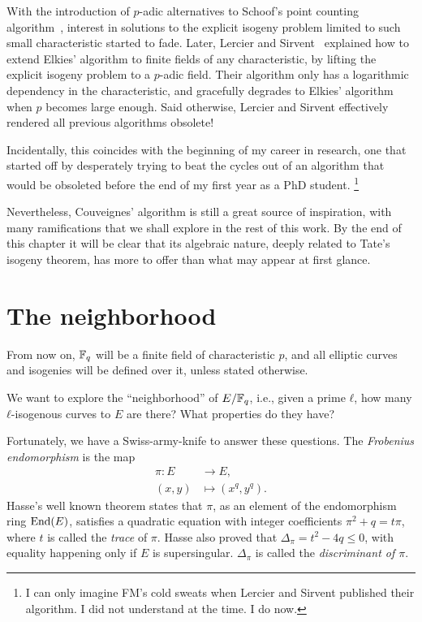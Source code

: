 \documentclass{report}
\theoremstyle{plain}
\theoremstyle{definition}
\begin{document}
With the introduction of $p$-adic alternatives to Schoof's point
counting
algorithm~\cite{satoh00,kedlaya01,kedlaya04,lauder04,10.2307/24522768},
interest in solutions to the explicit isogeny problem limited to such
small characteristic started to fade. %
Later, Lercier and Sirvent~\cite{lercier+sirvent08} explained how to
extend Elkies' algorithm to finite fields of any characteristic, by
lifting the explicit isogeny problem to a $p$-adic field. %
Their algorithm only has a logarithmic dependency in the
characteristic, and gracefully degrades to Elkies' algorithm when $p$
becomes large enough. %
Said otherwise, Lercier and Sirvent effectively rendered all previous
algorithms obsolete! %

Incidentally, this coincides with the beginning of my career in
research, one that started off by desperately trying to beat the
cycles out of an algorithm that would be obsoleted before the end of
my first year as a PhD student.%
\footnote{I can only imagine FM's cold sweats
  when Lercier and Sirvent published their algorithm. I did not
  understand at the time. I do now.}

Nevertheless, Couveignes' algorithm is still a great source of
inspiration, with many ramifications that we shall explore in the rest
of this work. %
By the end of this chapter it will be clear that its algebraic nature,
deeply related to Tate's isogeny theorem, has more to offer than what
may appear at first glance. %


\section{The neighborhood}

From now on, $\mathbb{F}_q$ will be a finite field of characteristic $p$, and
all elliptic curves and isogenies will be defined over it, unless
stated otherwise. %

We want to explore the ``neighborhood'' of $E/\mathbb{F}_q$, i.e., given a
prime $ℓ$, how many $ℓ$-isogenous curves to $E$ are there? What
properties do they have?

Fortunately, we have a Swiss-army-knife to answer these questions. %
The \emph{Frobenius endomorphism} is the map
\begin{equation*}
  \begin{aligned}
    π : E &→ E,\\
    (x,y) &↦ (x^q,y^q).
  \end{aligned}
\end{equation*}
Hasse's well known theorem states that $π$, as an element of the
endomorphism ring $\operatorname{End}(E)$, satisfies a quadratic equation with
integer coefficients $π^2 + q = tπ$, where $t$ is called the
\emph{trace} of $π$. %
Hasse also proved that $Δ_π=t^2-4q≤0$, with equality happening only if
$E$ is supersingular. %
$Δ_π$ is called the \emph{discriminant of $π$}. %
\end{document}
